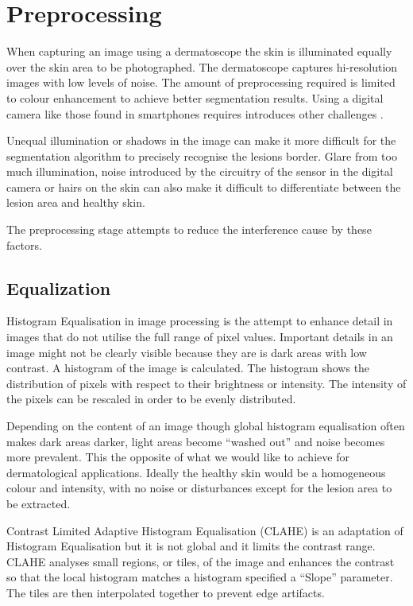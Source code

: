 \section{Preprocessing}

When capturing an image using a dermatoscope the skin is illuminated equally over the skin area to be photographed. The dermatoscope captures hi-resolution images with low levels of noise. The amount of preprocessing required is limited to colour enhancement to achieve better segmentation results. Using a digital camera like those found in smartphones requires introduces other challenges \cite{auto_seg}.

Unequal illumination or shadows in the image can make it more difficult for the segmentation algorithm to precisely recognise the lesions border. Glare from too much illumination, noise introduced by the circuitry of the sensor in the digital camera or hairs on the skin can also make it difficult to differentiate between the lesion area and healthy skin.

The preprocessing stage attempts to reduce the interference cause by these factors.


\subsection{Equalization}

Histogram Equalisation in image processing is the attempt to enhance detail in images that do not utilise the full range of pixel values. Important details in an image might not be clearly visible because they are is dark areas with low contrast. A histogram of the image is calculated. The histogram shows the distribution of pixels with respect to their brightness or intensity. The intensity of the pixels can be rescaled in order to be evenly distributed.

Depending on the content of an image though global histogram equalisation often makes dark areas darker, light areas become “washed out” and noise becomes more prevalent. This the opposite of what we would like to achieve for dermatological applications. Ideally the healthy skin would be a homogeneous colour and intensity, with no noise or disturbances except for the lesion area to be extracted.

Contrast Limited Adaptive Histogram Equalisation (CLAHE) is an adaptation of Histogram Equalisation but it is not global and it limits the contrast range. CLAHE analyses small regions, or tiles, of the image and enhances the contrast so that the local histogram matches a histogram specified a “Slope” parameter. The tiles are then interpolated together to prevent edge artifacts.


